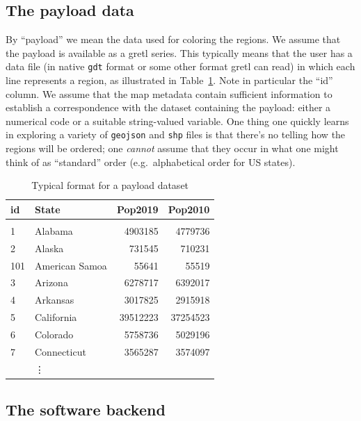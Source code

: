\documentclass{article}
\begin{document}
\subsection{The payload data}
\label{sec:payload}

By ``payload'' we mean the data used for coloring the regions.  We
assume that the payload is available as a gretl series. This typically
means that the user has a data file (in native \texttt{gdt} format or
some other format gretl can read) in which each line represents a
region, as illustrated in Table~\ref{tab:payload}. Note in particular
the ``id'' column.  We assume that the map metadata contain sufficient
information to establish a correspondence with the dataset containing
the payload: either a numerical code or a suitable string-valued
variable.  One thing one quickly learns in exploring a variety of
\texttt{geojson} and \texttt{shp} files is that there's no telling how
the regions will be ordered; one \textit{cannot} assume that they
occur in what one might think of as ``standard'' order (e.g.\
alphabetical order for US states).

\begin{table}[htbp]
\begin{center}
\begin{tabular}{llrr}
  id	& State & Pop2019 & Pop2010 \\
  \hline \\ [-1.75ex]
  1	& Alabama	& 4903185	& 4779736  \\
  2     & Alaska	& 731545	& 710231   \\
  101   & American Samoa	& 55641	& 55519	  \\
  3	& Arizona	& 6278717	& 6392017  \\
  4	& Arkansas	& 3017825	& 2915918  \\
  5	& California	& 39512223	& 37254523 \\
  6	& Colorado	& 5758736	& 5029196  \\
  7	& Connecticut	& 3565287	& 3574097  \\
                & \vdots & \\
\end{tabular}
\end{center}
\caption{Typical format for a payload dataset}
\label{tab:payload}
\end{table}

\subsection{The software backend}
\label{sec:software}
\end{document}
